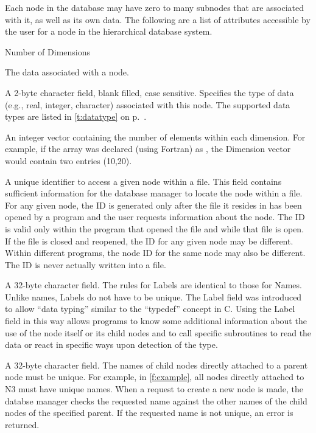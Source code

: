 Each node in the database may have zero to many subnodes that are
associated with it, as well as its own data.
The following are a list of attributes accessible by the user for a node
in the hierarchical database system.

\begin{Ventryi}{Number of Dimensions}
\item [Data]
      The data associated with a node.
\item [Data Type]
      A 2-byte character field, blank filled, case sensitive.
      Specifies the type of data (e.g., real, integer, character)
      associated with this node.
      The supported data types are listed in \autoref{t:datatype}
      on p.~\pageref*{t:datatype}.
\item [Dimensions]
      An integer vector containing the number of elements within
      each dimension.
      For example, if the array  was declared (using Fortran) as
      , the Dimension vector would contain two entries
      (10,20).
\item [ID]
      A unique identifier to access a given node within a file.
      This field contains sufficient information for the database manager
      to locate the node within a file.
      For any given node, the ID is generated only after the file it
      resides in has been opened by a program and the user requests
      information about the node.
      The ID is valid only within the program that opened the file and
      while that file is open.
      If the file is closed and reopened, the ID for any given node
      may be different.
      Within different programs, the node ID for the same node may
      also be different.
      The ID is never actually written into a file.
\item [Label]
      A 32-byte character field.
      The rules for Labels are identical to those for Names.
      Unlike names, Labels do not have to be unique.
      The Label field was introduced to allow ``data typing'' similar to
      the ``typedef'' concept in C.
      Using the Label field in this way allows programs to know some
      additional information about the use of the node itself or its
      child nodes and to call specific subroutines to read the data or
      react in specific ways upon detection of the type.
\item [Name]
      A 32-byte character field.
      The names of child nodes directly attached to a parent node must
      be unique.
      For example, in \autoref{f:example}, all nodes directly attached
      to N3 must have unique names.
      When a request to create a new node is made, the databse manager
      checks the requested name against the other names of the child
      nodes of the specified parent.
      If the requested name is not unique, an error is returned.


\end{Ventryi}
